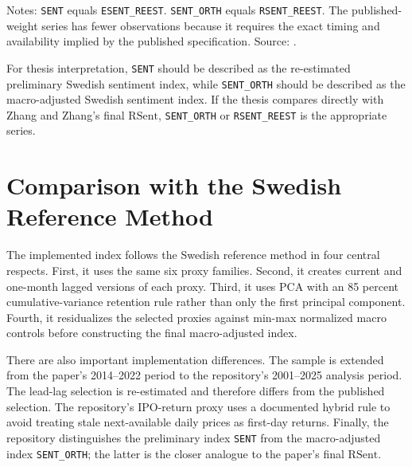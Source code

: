 \documentclass[12pt]{article}
\begin{document}
\begin{table}[htbp]
\centering
\caption{Descriptive Statistics for Sentiment Index Outputs}
\label{tab:sentiment_index_descriptive_statistics}
\begin{minipage}{0.95\textwidth}
\footnotesize
Notes: \texttt{SENT} equals \texttt{ESENT\_REEST}. \texttt{SENT\_ORTH} equals \texttt{RSENT\_REEST}. The published-weight series has fewer observations because it requires the exact timing and availability implied by the published specification. Source: .
\end{minipage}
\end{table}

For thesis interpretation, \texttt{SENT} should be described as the re-estimated preliminary Swedish sentiment index, while \texttt{SENT\_ORTH} should be described as the macro-adjusted Swedish sentiment index. If the thesis compares directly with Zhang and Zhang's final \(\mathrm{RSent}\), \texttt{SENT\_ORTH} or \texttt{RSENT\_REEST} is the appropriate series.

\section{Comparison with the Swedish Reference Method}

The implemented index follows the Swedish reference method in four central respects. First, it uses the same six proxy families. Second, it creates current and one-month lagged versions of each proxy. Third, it uses PCA with an 85 percent cumulative-variance retention rule rather than only the first principal component. Fourth, it residualizes the selected proxies against min-max normalized macro controls before constructing the final macro-adjusted index.

There are also important implementation differences. The sample is extended from the paper's 2014--2022 period to the repository's 2001--2025 analysis period. The lead-lag selection is re-estimated and therefore differs from the published selection. The repository's IPO-return proxy uses a documented hybrid rule to avoid treating stale next-available daily prices as first-day returns. Finally, the repository distinguishes the preliminary index \texttt{SENT} from the macro-adjusted index \texttt{SENT\_ORTH}; the latter is the closer analogue to the paper's final \(\mathrm{RSent}\).
\end{document}
